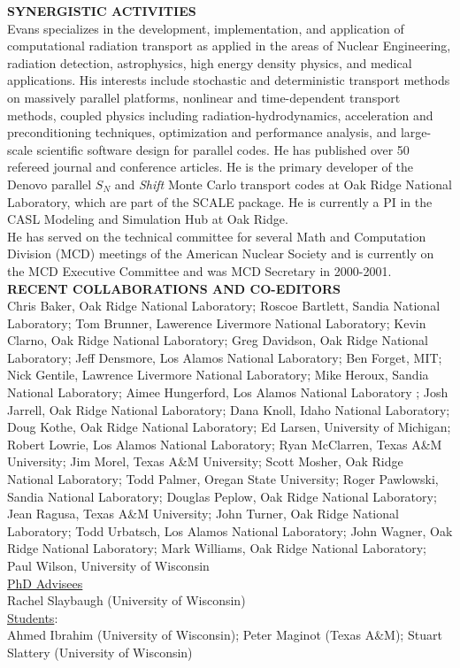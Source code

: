 \documentclass[11pt]{article}
\begin{document}

{\bf SYNERGISTIC ACTIVITIES}\\

Evans specializes in the development, implementation, and application of
computational radiation transport as applied in the areas of Nuclear
Engineering, radiation detection, astrophysics, high energy density physics,
and medical applications.  His interests include stochastic and deterministic
transport methods on massively parallel platforms, nonlinear and
time-dependent transport methods, coupled physics including
radiation-hydrodynamics, acceleration and preconditioning techniques,
optimization and performance analysis, and large-scale scientific software
design for parallel codes.  He has published over 50 refereed journal and
conference articles.  He is the primary developer of the Denovo parallel $S_N$
and {\em Shift} Monte Carlo transport codes at Oak Ridge National Laboratory,
which are part of the SCALE package.  He is currently a PI in the CASL
Modeling and Simulation Hub at Oak Ridge.\\

He has served on the technical committee for several Math and Computation
Division (MCD) meetings of the American Nuclear Society and is currently on
the MCD Executive Committee and was MCD Secretary in 2000-2001.\\


{\bf RECENT COLLABORATIONS AND CO-EDITORS}\\

Chris Baker, Oak Ridge National Laboratory;
Roscoe Bartlett, Sandia National Laboratory;
Tom Brunner, Lawerence Livermore National Laboratory;
Kevin Clarno, Oak Ridge National Laboratory;
Greg Davidson, Oak Ridge National Laboratory;
Jeff Densmore, Los Alamos National Laboratory;
Ben Forget, MIT;
Nick Gentile, Lawrence Livermore National Laboratory;
Mike Heroux, Sandia National Laboratory;
Aimee Hungerford, Los Alamos National Laboratory ;
Josh Jarrell, Oak Ridge National Laboratory;
Dana Knoll, Idaho National Laboratory;
Doug Kothe, Oak Ridge National Laboratory;
Ed Larsen, University of Michigan;
Robert Lowrie, Los Alamos National Laboratory;
Ryan McClarren, Texas A\&M University;
Jim Morel, Texas A\&M University;
Scott Mosher, Oak Ridge National Laboratory;
Todd Palmer, Oregan State University;
Roger Pawlowski, Sandia National Laboratory;
Douglas Peplow, Oak Ridge National Laboratory;
Jean Ragusa, Texas A\&M University;
John Turner, Oak Ridge National Laboratory;
Todd Urbatsch, Los Alamos National Laboratory;
John Wagner, Oak Ridge National Laboratory;
Mark Williams, Oak Ridge National Laboratory;
Paul Wilson, University of Wisconsin\\

\underline{PhD Advisees}\\
Rachel Slaybaugh (University of Wisconsin)\\

\underline{Students}:\\
Ahmed Ibrahim (University of Wisconsin);
Peter Maginot (Texas A\&M);
Stuart Slattery (University of Wisconsin)
\end{document}
